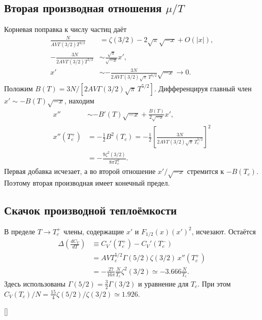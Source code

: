\documentclass[../final.tex]{subfiles}
\begin{document}
\clearpage
\subsection{Вторая производная отношения $\mu/T$}
Корневая поправка к числу частиц даёт
\begin{align*}
 \frac{N}{AV\Gamma(3/2)T^{3/2}}
 &=\zeta(3/2)-2\sqrt\pi\sqrt{-x}+O(|x|),\\
 -\frac{3N}{2AV\Gamma(3/2)T^{5/2}}
 &\sim\frac{\sqrt\pi}{\sqrt{-x}}x',\\
 x'&\sim-\frac{3N}{2AV\Gamma(3/2)\sqrt\pi\,T^{5/2}}\sqrt{-x}
 \longrightarrow0.
\end{align*}
Положим $B(T)=3N/[2AV\Gamma(3/2)\sqrt\pi\,T^{5/2}]$.
Дифференцируя главный член $x'\sim-B(T)\sqrt{-x}$, находим
\begin{align*}
 x''&\sim-B'(T)\sqrt{-x}+\frac{B(T)}{2\sqrt{-x}}x',\\
 x''(T_c^+)&=-\frac12B^2(T_c)
 =-\frac12\left[\frac{3N}{2AV\Gamma(3/2)\sqrt\pi\,T_c^{5/2}}\right]^2\\
 &=-\frac{9\zeta^2(3/2)}{8\pi T_c^2}.
\end{align*}
Первая добавка исчезает, а во второй отношение $x'/\sqrt{-x}$
стремится к $-B(T_c)$. Поэтому вторая производная имеет конечный предел.

\subsection{Скачок производной теплоёмкости}
В пределе $T\to T_c^+$ члены, содержащие $x'$ и
$F_{1/2}(x)(x')^2$, исчезают. Остаётся
\begin{align*}
 \Delta\!\left(\frac{dC_V}{dT}\right)
 &\equiv C_V'(T_c^+)-C_V'(T_c^-)\\
 &=AVT_c^{5/2}\Gamma(5/2)\zeta(3/2)\,x''(T_c^+)\\
 &=-\frac{27}{16\pi}\frac{N}{T_c}\zeta^2(3/2)
 \simeq-3.666\frac{N}{T_c}.
\end{align*}
Здесь использованы $\Gamma(5/2)=\tfrac32\Gamma(3/2)$ и уравнение для $T_c$.
При этом $C_V(T_c)/N=\tfrac{15}{4}\zeta(5/2)/\zeta(3/2)\simeq1.926$.

\begin{rbox}[unbreakable,left=14pt,right=14pt,top=10pt,bottom=8pt]{[]}
\centering
\captionsetup{font=footnotesize,hypcap=false,skip=5pt}
\end{rbox}
\end{document}
